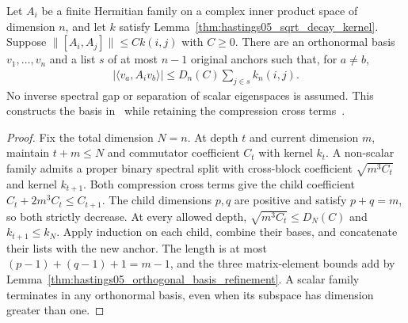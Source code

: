 \begin{lemma}
    \label{thm:hastings05_recursive_uniform_basis}
    \leanok
    Let $A_i$ be a finite Hermitian family on a complex inner product space of
    dimension $n$, and let $k$ satisfy Lemma~\ref{thm:hastings05_sqrt_decay_kernel}.
    Suppose $\|[A_i,A_j]\|\le Ck(i,j)$ with $C\ge0$.
    There are an orthonormal basis $v_1,\ldots,v_n$ and a list $s$ of at most
    $n-1$ original anchors such that, for $a\ne b$,
    \begin{align*}
        |\langle v_a,A_iv_b\rangle|\le D_n(C)\sum_{j\in s}k_n(i,j).
    \end{align*}
    No inverse spectral gap or separation of scalar eigenspaces is assumed.
    This constructs the basis in~\cite[lines 1695--1708]{Hastings2006Solving}
    while retaining the compression cross terms~\cite{gap:hastings05_two_dim_ground_basis}.
\end{lemma}
\begin{proof}\leanok
    Fix the total dimension $N=n$. At depth $t$ and current dimension $m$, maintain
    $t+m\le N$ and commutator coefficient $C_t$ with kernel $k_t$.
    A non-scalar family admits a proper binary spectral split with cross-block
    coefficient $\sqrt{m^3C_t}$ and kernel $k_{t+1}$.
    Both compression cross terms give the child coefficient
    $C_t+2m^3C_t\le C_{t+1}$. The child dimensions $p,q$ are positive and satisfy
    $p+q=m$, so both strictly decrease. At every allowed depth,
    $\sqrt{m^3C_t}\le D_N(C)$ and $k_{t+1}\le k_N$.
    Apply induction on each child, combine their bases, and concatenate their
    lists with the new anchor. The length is at most
    $(p-1)+(q-1)+1=m-1$, and the three matrix-element bounds add by
    Lemma~\ref{thm:hastings05_orthogonal_basis_refinement}.
    A scalar family terminates in any orthonormal basis, even when its subspace
    has dimension greater than one.
\end{proof}

